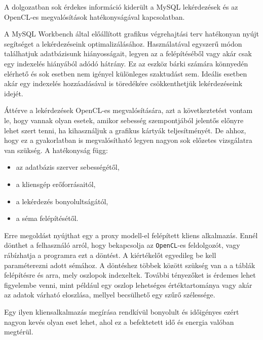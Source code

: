 
A dolgozatban sok érdekes információ kiderült a MySQL lekérdezések és az OpenCL-es megvalósítások hatékonyságával kapcsolatban.

A MySQL Workbench által előállított grafikus végrehajtási terv hatékonyan nyújt segítséget a lekérdezéseink optimalizálásához. Használatával egyszerű módon találhatjuk adatbázisunk hiányosságait, legyen az a felépítéséből vagy akár csak egy indexelés hiányából adódó hátrány. Ez az eszköz bárki számára könnyedén elérhető és sok esetben nem igényel különleges szaktudást sem. Ideális esetben akár egy indexelés hozzáadásával is töredékére csökkenthetjük lekérdezéseink idejét.

Áttérve a lekérdezések OpenCL-es megvalósítására, azt a következtetést vontam le, hogy vannak olyan esetek, amikor sebesség szempontjából jelentős előnyre lehet szert tenni, ha kihasználjuk a grafikus kártyák teljesítményét. De ahhoz, hogy ez a gyakorlatban is megvalósítható legyen nagyon sok előzetes vizsgálatra van szükség. A hatékonyság függ:
\begin{itemize}
\item az adatbázis szerver sebességétől,
\item a kliensgép erőforrásaitól,
\item a lekérdezés bonyolultságától,
\item a séma felépítésétől.
\end{itemize}

Erre megoldást nyújthat egy a proxy modell-el felépített kliens alkalmazás. Ennél dönthet a felhasználó arról, hogy bekapcsolja az \texttt{OpenCL}-es feldolgozót, vagy rábízhatja a programra ezt a döntést. A kiértékelőt egyedileg be kell paraméterezni adott sémához. A döntéshez többek között szükség van a a táblák felépítésre és arra, mely oszlopok indexeltek. További tényezőket is érdemes lehet figyelembe venni, mint például egy oszlop lehetséges értéktartománya vagy akár az adatok várható eloszlása, mellyel becsülhető egy szűrő szélessége. 

Egy ilyen kliensalkalmazás megírása rendkívül bonyolult és időigényes ezért nagyon kevés olyan eset lehet, ahol ez a befektetett idő és energia valóban megtérül. 
